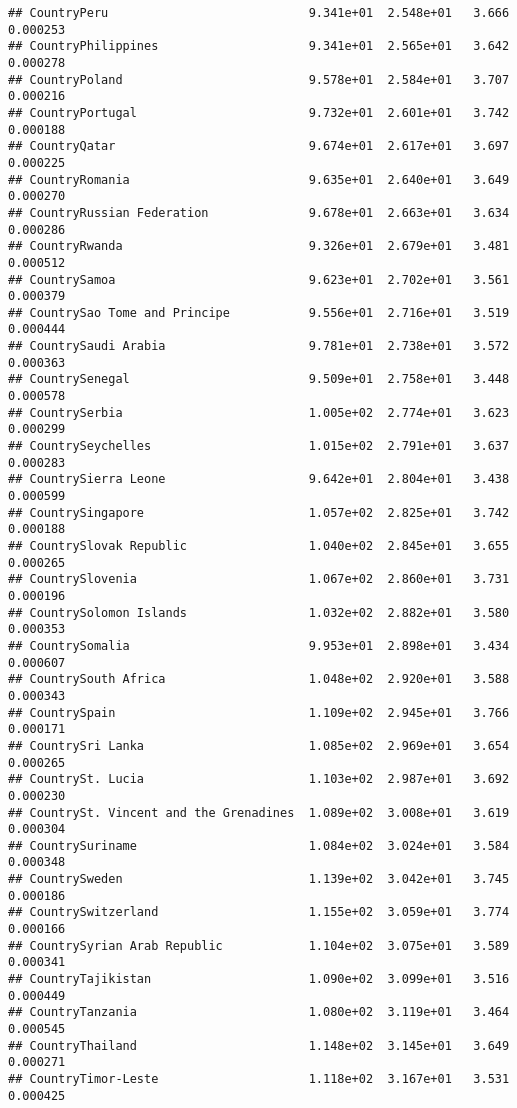 \documentclass[
]{article}
\begin{document}
\begin{verbatim}
## CountryPeru                            9.341e+01  2.548e+01   3.666 0.000253
## CountryPhilippines                     9.341e+01  2.565e+01   3.642 0.000278
## CountryPoland                          9.578e+01  2.584e+01   3.707 0.000216
## CountryPortugal                        9.732e+01  2.601e+01   3.742 0.000188
## CountryQatar                           9.674e+01  2.617e+01   3.697 0.000225
## CountryRomania                         9.635e+01  2.640e+01   3.649 0.000270
## CountryRussian Federation              9.678e+01  2.663e+01   3.634 0.000286
## CountryRwanda                          9.326e+01  2.679e+01   3.481 0.000512
## CountrySamoa                           9.623e+01  2.702e+01   3.561 0.000379
## CountrySao Tome and Principe           9.556e+01  2.716e+01   3.519 0.000444
## CountrySaudi Arabia                    9.781e+01  2.738e+01   3.572 0.000363
## CountrySenegal                         9.509e+01  2.758e+01   3.448 0.000578
## CountrySerbia                          1.005e+02  2.774e+01   3.623 0.000299
## CountrySeychelles                      1.015e+02  2.791e+01   3.637 0.000283
## CountrySierra Leone                    9.642e+01  2.804e+01   3.438 0.000599
## CountrySingapore                       1.057e+02  2.825e+01   3.742 0.000188
## CountrySlovak Republic                 1.040e+02  2.845e+01   3.655 0.000265
## CountrySlovenia                        1.067e+02  2.860e+01   3.731 0.000196
## CountrySolomon Islands                 1.032e+02  2.882e+01   3.580 0.000353
## CountrySomalia                         9.953e+01  2.898e+01   3.434 0.000607
## CountrySouth Africa                    1.048e+02  2.920e+01   3.588 0.000343
## CountrySpain                           1.109e+02  2.945e+01   3.766 0.000171
## CountrySri Lanka                       1.085e+02  2.969e+01   3.654 0.000265
## CountrySt. Lucia                       1.103e+02  2.987e+01   3.692 0.000230
## CountrySt. Vincent and the Grenadines  1.089e+02  3.008e+01   3.619 0.000304
## CountrySuriname                        1.084e+02  3.024e+01   3.584 0.000348
## CountrySweden                          1.139e+02  3.042e+01   3.745 0.000186
## CountrySwitzerland                     1.155e+02  3.059e+01   3.774 0.000166
## CountrySyrian Arab Republic            1.104e+02  3.075e+01   3.589 0.000341
## CountryTajikistan                      1.090e+02  3.099e+01   3.516 0.000449
## CountryTanzania                        1.080e+02  3.119e+01   3.464 0.000545
## CountryThailand                        1.148e+02  3.145e+01   3.649 0.000271
## CountryTimor-Leste                     1.118e+02  3.167e+01   3.531 0.000425

\end{verbatim}
\end{document}
